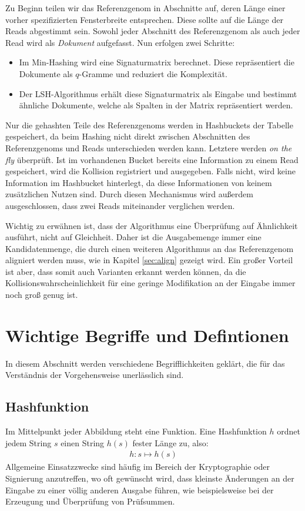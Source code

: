 Zu Beginn teilen wir das Referenzgenom in Abschnitte auf, deren Länge einer vorher spezifizierten Fensterbreite entsprechen.
Diese sollte auf die Länge der Reads abgestimmt sein.
Sowohl jeder Abschnitt des Referenzgenom als auch jeder Read wird als \textit{Dokument} aufgefasst.
Nun erfolgen zwei Schritte:
\begin{itemize}
	\item Im Min-Hashing wird eine Signaturmatrix berechnet.
Diese repräsentiert die Dokumente als $q$-Gramme und reduziert die Komplexität.
	\item Der LSH-Algorithmus erhält diese Signaturmatrix als Eingabe und bestimmt ähnliche Dokumente, welche als Spalten in der Matrix repräsentiert werden.
\end{itemize}
\newpage
Nur die gehashten Teile des Referenzgenoms werden in Hashbuckets der Tabelle gespeichert, da beim Hashing nicht direkt zwischen Abschnitten des Referenzgenoms und Reads unterschieden werden kann.
Letztere werden \textit{on the fly} überprüft.
Ist im vorhandenen Bucket bereits eine Information zu einem Read gespeichert, wird die Kollision registriert und ausgegeben.
Falls nicht, wird keine Information im Hashbucket hinterlegt, da diese Informationen von keinem zusätzlichen Nutzen sind.
Durch diesen Mechanismus wird außerdem ausgeschlossen, dass zwei Reads miteinander verglichen werden.

Wichtig zu erwähnen ist, dass der Algorithmus eine Überprüfung auf Ähnlichkeit ausführt, nicht auf Gleichheit.
Daher ist die Ausgabemenge immer eine Kandidatenmenge, die durch einen weiteren Algorithmus an das Referenzgenom aligniert werden muss, wie in Kapitel \ref{sec:align} gezeigt wird.
Ein großer Vorteil ist aber, dass somit auch Varianten erkannt werden können, da die Kollisionswahrscheinlichkeit für eine geringe Modifikation an der Eingabe immer noch groß genug ist.

\section{Wichtige Begriffe und Defintionen}
In diesem Abschnitt werden verschiedene Begrifflichkeiten geklärt, die für das Verständnis der Vorgehensweise unerlässlich sind.
\subsection{Hashfunktion}
\label{sec:hash:func}
Im Mittelpunkt jeder Abbildung steht eine Funktion.
Eine Hashfunktion $h$ ordnet jedem String $s$ einen String $h(s)$ fester Länge zu, also:
\begin{align*}
	h: s \mapsto h(s)
\end{align*}
Allgemeine Einsatzzwecke sind häufig im Bereich der Kryptographie oder Signierung anzutreffen, wo oft gewünscht wird, dass kleinste Änderungen an der Eingabe zu einer völlig anderen Ausgabe führen, wie beispielsweise bei der Erzeugung und Überprüfung von Prüfsummen.

